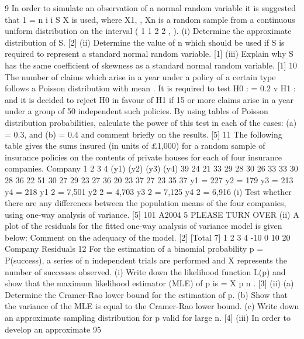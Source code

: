 
9 In order to simulate an observation of a normal random variable it is suggested that
1
=
n
i
i
S X
is used, where X1, , Xn is a random sample from a continuous uniform distribution
on the interval ( 1 1
2 2 , ).
(i) Determine the approximate distribution of S. [2]
(ii) Determine the value of n which should be used if S is required to represent a
standard normal random variable. [1]
(iii) Explain why S has the same coefficient of skewness as a standard normal
random variable. [1]
10 The number of claims which arise in a year under a policy of a certain type follows a
Poisson distribution with mean . It is required to test
H0 : = 0.2 v H1 :
and it is decided to reject H0 in favour of H1 if 15 or more claims arise in a year under
a group of 50 independent such policies.
By using tables of Poisson distribution probabilities, calculate the power of this test in
each of the cases:
(a) = 0.3, and
(b) = 0.4
and comment briefly on the results. [5]
11 The following table gives the sums insured (in units of £1,000) for a random sample
of insurance policies on the contents of private houses for each of four insurance
companies.
Company
1 2 3 4
(y1) (y2) (y3) (y4)
39 24 21 33
29 28 30 26
33 33 30 28
36 22 51 30
27 29 23 27
36 20 23 37
27 23 35 37
y1 = 227 y2 = 179 y3 = 213 y4 = 218
y1
2 = 7,501 y2
2 = 4,703 y3
2 = 7,125 y4
2 = 6,916
(i) Test whether there are any differences between the population means of the
four companies, using one-way analysis of variance.
[5]
101 A2004 5 PLEASE TURN OVER
(ii) A plot of the residuals for the fitted one-way analysis of variance model is
given below:
Comment on the adequacy of the model. [2]
[Total 7]
1 2 3 4
-10
0
10
20
Company
Residuals
12 For the estimation of a binomial probability p = P(success), a series of n independent
trials are performed and X represents the number of successes observed.
(i) Write down the likelihood function L(p) and show that the maximum
likelihood estimator (MLE) of p is =
X
p
n
.
[3]
(ii) (a) Determine the Cramer-Rao lower bound for the estimation of p.
(b) Show that the variance of the MLE is equal to the Cramer-Rao lower
bound.
(c) Write down an approximate sampling distribution for p valid for
large n.
[4]
(iii) In order to develop an approximate 95%
